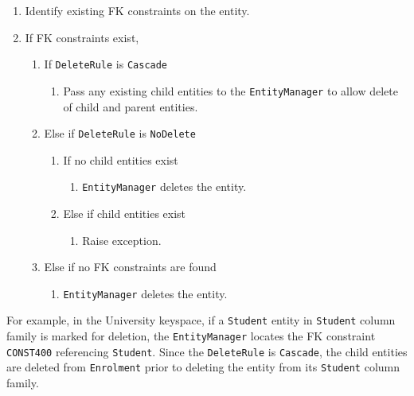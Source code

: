 \begin{description}
		\begin{enumerate}
		  \item Identify existing \ac{FK} constraints on the entity.
		  \item If \ac{FK} constraints exist,
		  		\begin{enumerate}
		  		  \item If \texttt{DeleteRule} is \texttt{Cascade}
		  		 		\begin{enumerate}
		  		 		   \item Pass any existing child entities to the \texttt{EntityManager}
		  		 		   to allow delete of child  and parent entities.
		  		 		\end{enumerate}
		  		  \item Else if \texttt{DeleteRule}  is \texttt{NoDelete}
						\begin{enumerate}
						  \item If no child entities exist
						  		\begin{enumerate}
						  		  \item \texttt{EntityManager} deletes the entity.
						  		\end{enumerate}
						  \item Else if child entities exist
						   		\begin{enumerate}
						    		\item Raise exception. 
						    	\end{enumerate}
						\end{enumerate}
						
				  \item Else if no \ac{FK} constraints are found 
				  		\begin{enumerate}
				  		  \item \texttt{EntityManager} deletes the entity.
						\end{enumerate}
		  		\end{enumerate}
		\end{enumerate}	
		For example,  in the University keyspace,  if a 
		\texttt{Student} entity in \texttt{Student} column family is marked for
		deletion, the \texttt{EntityManager} locates the \ac{FK} constraint 
		\texttt{CONST400} referencing \texttt{Student}.
		Since the \texttt{DeleteRule} is \texttt{Cascade}, 
		the child entities are deleted from \texttt{Enrolment} prior to deleting the
		entity from its \texttt{Student} column family. 
		\end{description}
		

